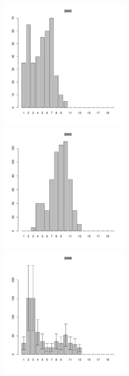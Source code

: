 \documentclass[12pt, a4paper]{article}
\begin{document}
\begin{figure}[h]
\begin{multicols}{3}
\hfill
\includegraphics[width=65mm]{../White_Sea/Luvenga_Goreliy/midlow_2002_.pdf}
\hfill
\includegraphics[width=65mm]{../White_Sea/Luvenga_Goreliy/midlow_2005_.pdf}
\hfill
\includegraphics[width=65mm]{../White_Sea/Luvenga_Goreliy/midlow_2008_.pdf}
\end{multicols}




\end{figure}
\end{document}
